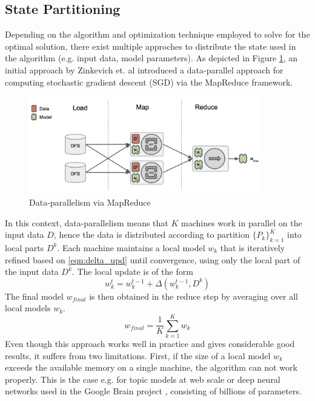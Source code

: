 \subsection{State Partitioning}
Depending on the algorithm and optimization technique employed to solve for the optimal solution, there exist multiple approches to distribute the state used in the algorithm (e.g. input data, model parameters).
As depicted in Figure \ref{fig:data_parallelism}, an initial approach by Zinkevich et. al \cite{zinkevich2010parallelized} introduced a data-parallel approach for computing stochastic gradient descent (SGD) via the MapReduce framework.
\begin{figure}[ht]
\centering
\includegraphics[width=0.9\textwidth]{img/data_parallelism.png}
\caption{Data-parallelism via MapReduce}
\label{fig:data_parallelism}
\end{figure}
In this context, data-parallelism means that $K$ machines work in parallel on the input data $D$, hence the data is distributed according to partition $\{P_k\}_{k=1}^K$ into local parts $D^k$.
Each machine maintains a local model $w_k$ that is iteratively refined based on \ref{eqn:delta_upd} until convergence, using only the local part of the input data $D^k$.
The local update is of the form
\begin{equation}
w_k^{t} = w_k^{t-1} + \Delta(w_k^{t-1},D^k)
\label{eqn:local_delta_upd}
\end{equation}
The final model $w_{final}$ is then obtained in the reduce step by averaging over all local models $w_{k}$.
\begin{equation}
w_{final} = \frac{1}{K}\sum_{k=1}^{K}w_{k}
\label{eqn:avg_sgd}
\end{equation}
Even though this approach works well in practice and gives considerable good results, it suffers from two limitations.
First, if the size of a local model $w_k$ exceeds the available memory on a single machine, the algorithm can not work properly.
This is the case e.g. for topic models at web scale or deep neural networks used in the Google Brain project \cite{dean2012large}, consisting of billions of parameters.
